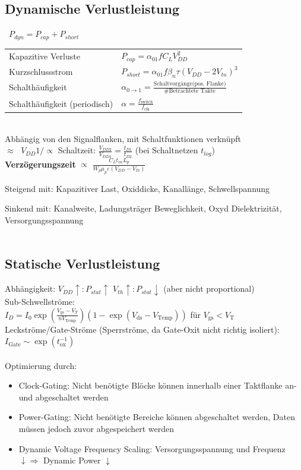 \documentclass[english]{latex4ei/latex4ei_sheet}
\begin{document}
\subsection{Dynamische Verlustleistung}
 \qquad \ $P_{dyn} = P_{cap} + P_{short}$\\
\begin{tabular}{ll}
	\quad Kapazitive Verluste \qquad \ \quad \ & $P_{cap} = \alpha_{01} f C_L V_{DD}^2$\\
	\quad Kurzschlussstrom	& $P_{short} = \alpha_{01} f \beta_n \tau (V_{DD} - 2V_{tn})^3$\\[0.8em]
	\quad Schalthäufigkeit & $\alpha_{0 \rightarrow 1} = \frac{\text{Schaltvorgänge(pos. Flanke)}}{\text{\# Betrachtete Takte}}$\\
	\quad Schalthäufigkeit (periodisch) & $\alpha = \frac{f_\text{switch}}{f_\text{clk}}$\\
\end{tabular}\\
Abhängig von den Signalflanken, mit Schaltfunktionen verknüpft\\ 
$\approx \;$ $V_{DD} 1/\propto $ Schaltzeit: $\frac{V_{DD2}}{V_{DD1}} = \frac{t_{D1}}{t_{D2}}$ (bei Schaltnetzen $t_{log}$)\\
\textbf{Verzögerungszeit} $\propto$ $\frac{C_Lt_{ox}L_p}{W_p\mu_p\varepsilon(V_{DD} - V_{th})}$

Steigend mit: Kapazitiver Last, Oxiddicke, Kanallänge, Schwellspannung

Sinkend mit: Kanalweite, Ladungsträger Beweglichkeit, Oxyd Dielektrizität, Versorgungsspannung \\ \\
\subsection{Statische Verlustleistung}
Abhängigkeit: $V_{DD}\uparrow:P_{stat}\uparrow$ \qquad $V_{th}\uparrow:P_{stat}\downarrow$ \quad (aber nicht proportional)\\
Sub-Schwellströme:\\
$I_D= I_0 \exp\left(\frac{V_{\text{gs}}-V_T}{nV_{\text{Temp}}}\right) \left(1-\exp\left(V_{\text{ds}}-V_{\text{Temp}}\right)\right)$ für $V_{\text{gs}} < V_{\text{T}}$\\
Leckströme/Gate-Ströme (Sperrströme, da Gate-Oxit nicht richtig isoliert):\\
$I_{\text{Gate}} \sim \exp\left(t_{\text{ox}}^{-1}\right)$\\
\\
Optimierung durch:
\begin{itemize}
	\item Clock-Gating: Nicht benötigte Blöcke können innerhalb einer Taktflanke an- und abgeschaltet werden
	\item Power-Gating: Nicht benötigte Bereiche können abgeschaltet werden, Daten müssen jedoch zuvor abgespeichert werden
	\item Dynamic Voltage Frequency Scaling: Versorgungsspannung und Frequenz $\downarrow \Rightarrow$ Dynamic Power $\downarrow$
\end{itemize}
\end{document}
